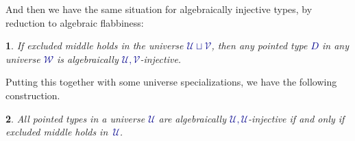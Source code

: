 \documentclass[10pt]{article}
\newcommand{\db}{\textcolor{darkblue}}
\newcommand{\df}[1]{\emph{\db{#1}}}
\newcommand{\m}[1]{\db{$#1$}}
\newcommand{\U}{\mathcal{U}}
\newcommand{\V}{\mathcal{V}}
\newcommand{\W}{\mathcal{W}}
\newcommand{\Zero}{\mathbb{0}}
\newcommand{\One}{\mathbb{1}}
\newtheorem{numbered}{}
\theoremstyle{definition}
\begin{document}
\noindent
And then we have the same situation for algebraically injective types,
by reduction to algebraic flabbiness:
\begin{numbered}
  If excluded middle holds in the universe \m{\U \sqcup \V}, then any
  pointed type \m{D} in any universe \m{\W} is algebraically
  \m{\U,\V}-injective.
\end{numbered}
\noindent Putting this together with some universe specializations, we
have the following construction.
\begin{numbered} %
  All pointed types in a universe \m{\U} are algebraically \m{\U,\U}-injective if and only if excluded middle holds in~\m{\U}.
\end{numbered}
\end{document}
